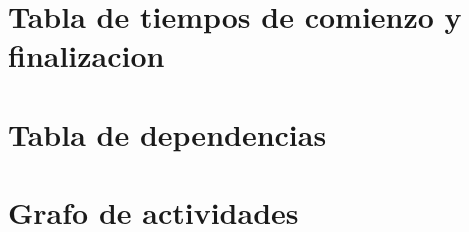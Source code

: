 \documentclass[11pt,a4paper,spanish,twoside]{report}
\begin{document}
      

\section{Tabla de tiempos de comienzo y finalizacion}
\section{Tabla de dependencias}
\section{Grafo de actividades}


 

\end{document}
